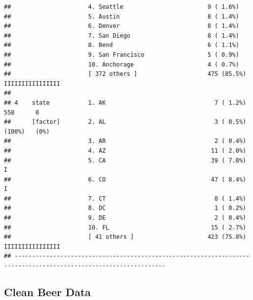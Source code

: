 \documentclass[]{article}
\begin{document}
\begin{verbatim}
##                      4. Seattle                        9 ( 1.6%)                                                 
##                      5. Austin                         8 ( 1.4%)                                                 
##                      6. Denver                         8 ( 1.4%)                                                 
##                      7. San Diego                      8 ( 1.4%)                                                 
##                      8. Bend                           6 ( 1.1%)                                                 
##                      9. San Francisco                  5 ( 0.9%)                                                 
##                      10. Anchorage                     4 ( 0.7%)                                                 
##                      [ 372 others ]                    475 (85.5%)          IIIIIIIIIIIIIIII                     
## 
## 4    state           1. AK                               7 ( 1.2%)                             558      0        
##      [factor]        2. AL                               3 ( 0.5%)                             (100%)   (0%)     
##                      3. AR                               2 ( 0.4%)                                               
##                      4. AZ                              11 ( 2.0%)                                               
##                      5. CA                              39 ( 7.0%)          I                                    
##                      6. CO                              47 ( 8.4%)          I                                    
##                      7. CT                               8 ( 1.4%)                                               
##                      8. DC                               1 ( 0.2%)                                               
##                      9. DE                               2 ( 0.4%)                                               
##                      10. FL                             15 ( 2.7%)                                               
##                      [ 41 others ]                     423 (75.8%)          IIIIIIIIIIIIIIII                     
## -----------------------------------------------------------------------------------------------------------------
\end{verbatim}

\subsection{Clean Beer Data}\label{clean-beer-data}
\end{document}
